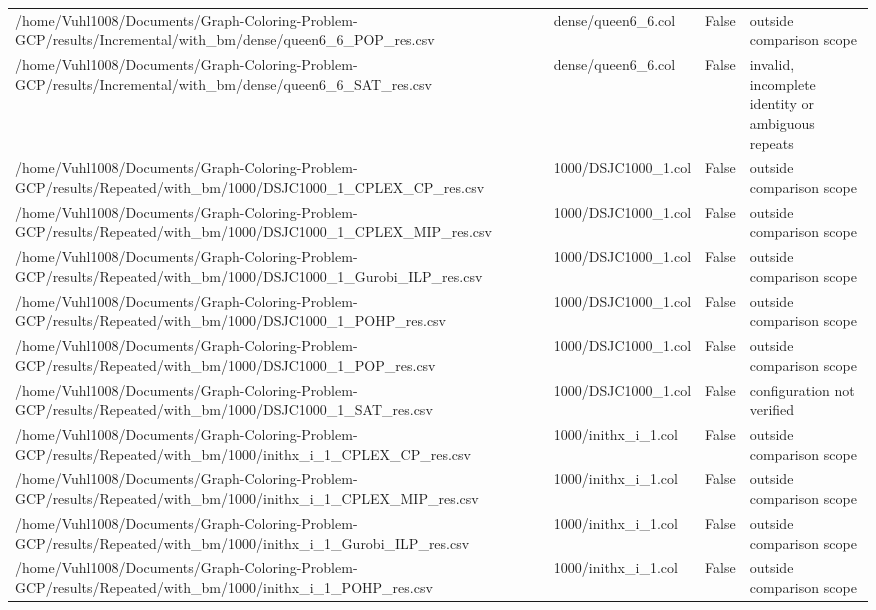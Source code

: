 \begin{table}[htbp]
\begin{tabular}{llll}
/home/Vuhl1008/Documents/Graph-Coloring-Problem-GCP/results/Incremental/with\_bm/dense/queen6\_6\_POP\_res.csv & dense/queen6\_6.col & False & outside comparison scope \\
/home/Vuhl1008/Documents/Graph-Coloring-Problem-GCP/results/Incremental/with\_bm/dense/queen6\_6\_SAT\_res.csv & dense/queen6\_6.col & False & invalid, incomplete identity or ambiguous repeats \\
/home/Vuhl1008/Documents/Graph-Coloring-Problem-GCP/results/Repeated/with\_bm/1000/DSJC1000\_1\_CPLEX\_CP\_res.csv & 1000/DSJC1000\_1.col & False & outside comparison scope \\
/home/Vuhl1008/Documents/Graph-Coloring-Problem-GCP/results/Repeated/with\_bm/1000/DSJC1000\_1\_CPLEX\_MIP\_res.csv & 1000/DSJC1000\_1.col & False & outside comparison scope \\
/home/Vuhl1008/Documents/Graph-Coloring-Problem-GCP/results/Repeated/with\_bm/1000/DSJC1000\_1\_Gurobi\_ILP\_res.csv & 1000/DSJC1000\_1.col & False & outside comparison scope \\
/home/Vuhl1008/Documents/Graph-Coloring-Problem-GCP/results/Repeated/with\_bm/1000/DSJC1000\_1\_POHP\_res.csv & 1000/DSJC1000\_1.col & False & outside comparison scope \\
/home/Vuhl1008/Documents/Graph-Coloring-Problem-GCP/results/Repeated/with\_bm/1000/DSJC1000\_1\_POP\_res.csv & 1000/DSJC1000\_1.col & False & outside comparison scope \\
/home/Vuhl1008/Documents/Graph-Coloring-Problem-GCP/results/Repeated/with\_bm/1000/DSJC1000\_1\_SAT\_res.csv & 1000/DSJC1000\_1.col & False & configuration not verified \\
/home/Vuhl1008/Documents/Graph-Coloring-Problem-GCP/results/Repeated/with\_bm/1000/inithx\_i\_1\_CPLEX\_CP\_res.csv & 1000/inithx\_i\_1.col & False & outside comparison scope \\
/home/Vuhl1008/Documents/Graph-Coloring-Problem-GCP/results/Repeated/with\_bm/1000/inithx\_i\_1\_CPLEX\_MIP\_res.csv & 1000/inithx\_i\_1.col & False & outside comparison scope \\
/home/Vuhl1008/Documents/Graph-Coloring-Problem-GCP/results/Repeated/with\_bm/1000/inithx\_i\_1\_Gurobi\_ILP\_res.csv & 1000/inithx\_i\_1.col & False & outside comparison scope \\
/home/Vuhl1008/Documents/Graph-Coloring-Problem-GCP/results/Repeated/with\_bm/1000/inithx\_i\_1\_POHP\_res.csv & 1000/inithx\_i\_1.col & False & outside comparison scope \\

\end{tabular}
\end{table}
